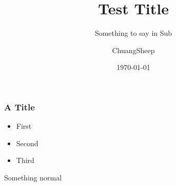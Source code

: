 \documentclass[american,aspectratio=169]{beamer}
\title{Test Title}
\subtitle{Something to say in Sub}
\date{\today}
\author{ChuangSheep}
\begin{document}
\begin{frame} 
  \titlepage
\end{frame}

\begin{frame}
  \frametitle{A Title}

  \begin{itemize}
    \item First
    \item Second 
    \item Third
  \end{itemize}

  Something normal
\end{frame}
\end{document}
